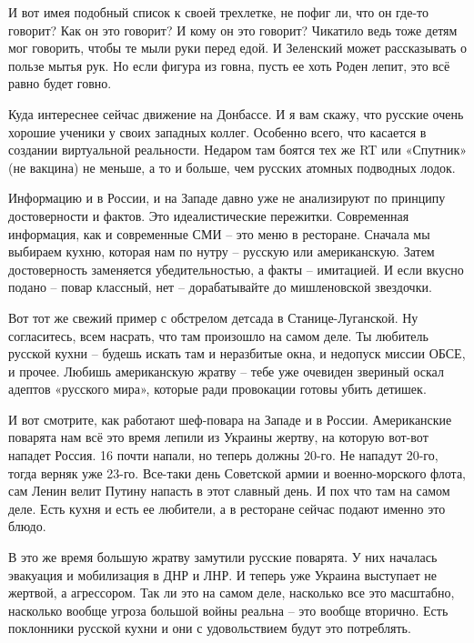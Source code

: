 И вот имея подобный список к своей трехлетке, не пофиг ли, что он где-то
говорит? Как он это говорит? И кому он это говорит? Чикатило ведь тоже детям
мог говорить, чтобы те мыли руки перед едой. И Зеленский может рассказывать о
пользе мытья рук. Но если фигура из говна, пусть ее хоть Роден лепит, это всё
равно будет говно.

Куда интереснее сейчас движение на Донбассе. И я вам скажу, что русские очень
хорошие ученики у своих западных коллег. Особенно всего, что касается в
создании виртуальной реальности. Недаром там боятся тех же RT или «Спутник» (не
вакцина) не меньше, а то и больше, чем русских атомных подводных лодок.

Информацию и в России, и на Западе давно уже не анализируют по принципу
достоверности и фактов. Это идеалистические пережитки. Современная информация,
как и современные СМИ – это меню в ресторане. Сначала мы выбираем кухню,
которая нам по нутру – русскую или американскую. Затем достоверность заменяется
убедительностью, а факты – имитацией. И если вкусно подано – повар классный,
нет – дорабатывайте до мишленовской звездочки.

Вот тот же свежий пример с обстрелом детсада в Станице-Луганской. Ну
согласитесь, всем насрать, что там произошло на самом деле. Ты любитель русской
кухни – будешь искать там и неразбитые окна, и недопуск миссии ОБСЕ, и прочее.
Любишь американскую жратву – тебе уже очевиден звериный оскал адептов «русского
мира», которые ради провокации готовы убить детишек.

И вот смотрите, как работают шеф-повара на Западе и в России. Американские
поварята нам всё это время лепили из Украины жертву, на которую вот-вот нападет
Россия. 16 почти напали, но теперь должны 20-го. Не нападут 20-го, тогда верняк
уже 23-го. Все-таки день Советской армии и военно-морского флота, сам Ленин
велит Путину напасть в этот славный день. И пох что там на самом деле. Есть
кухня и есть ее любители, а в ресторане сейчас подают именно это блюдо.

В это же время большую жратву замутили русские поварята. У них началась
эвакуация и мобилизация в ДНР и ЛНР. И теперь уже Украина выступает не жертвой,
а агрессором. Так ли это на самом деле, насколько все это масштабно, насколько
вообще угроза большой войны реальна – это вообще вторично. Есть поклонники
русской кухни и они с удовольствием будут это потреблять.
